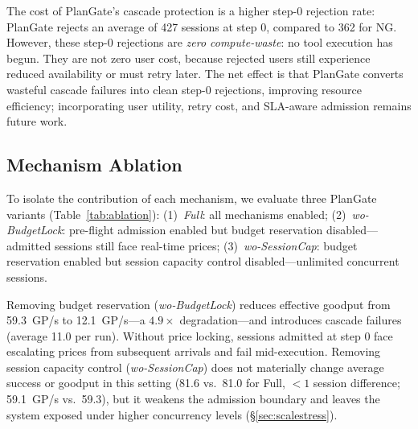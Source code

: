 \documentclass[sigconf,review,anonymous]{acmart}
\begin{document}
The cost of PlanGate's cascade protection is a higher step-0 rejection rate: PlanGate rejects an average of 427 sessions at step 0, compared to 362 for NG. However, these step-0 rejections are \emph{zero compute-waste}: no tool execution has begun. They are not zero user cost, because rejected users still experience reduced availability or must retry later. The net effect is that PlanGate converts wasteful cascade failures into clean step-0 rejections, improving resource efficiency; incorporating user utility, retry cost, and SLA-aware admission remains future work.
\subsection{Mechanism Ablation}

\begin{table}[t]
\caption{Mechanism ablation (500 sessions, averaged over 5 runs).}
\label{tab:ablation}
\small
{}
\end{table}
To isolate the contribution of each mechanism, we evaluate three PlanGate variants (Table~\ref{tab:ablation}): (1)~\emph{Full}: all mechanisms enabled; (2)~\emph{wo-BudgetLock}: pre-flight admission enabled but budget reservation disabled---admitted sessions still face real-time prices; (3)~\emph{wo-SessionCap}: budget reservation enabled but session capacity control disabled---unlimited concurrent sessions.


Removing budget reservation (\emph{wo-BudgetLock}) reduces effective goodput from 59.3~GP/s to 12.1~GP/s---a $4.9\times$ degradation---and introduces cascade failures (average 11.0 per run). Without price locking, sessions admitted at step 0 face escalating prices from subsequent arrivals and fail mid-execution. Removing session capacity control (\emph{wo-SessionCap}) does not materially change average success or goodput in this setting (81.6 vs.\ 81.0 for Full, ${<}1$ session difference; 59.1~GP/s vs.\ 59.3), but it weakens the admission boundary and leaves the system exposed under higher concurrency levels (\S\ref{sec:scalestress}).
\end{document}
